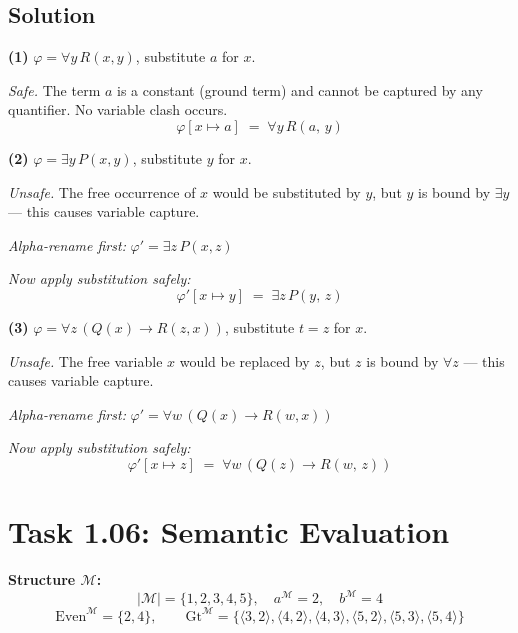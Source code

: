 \documentclass[11pt,a4paper]{article}
\newenvironment{solution}{%
    \begin{tcolorbox}[
        breakable,
        colback=green!4,
        colframe=green!50!black,
        fonttitle=\bfseries,
        title={ Solution},
        left=6pt, right=6pt, top=4pt, bottom=4pt
    ]%
    }{%
    \end{tcolorbox}%
}
\begin{document}
    \subsection*{Solution}
    \begin{solution}
        \textbf{(1)} $\varphi = \forall y\,R(x,y)$, substitute $a$ for $x$.

        \textit{Safe.} The term $a$ is a constant (ground term) and cannot be captured by any quantifier. No variable clash occurs.
        \[
            \varphi[x \mapsto a] \;=\; \forall y\,R(a,\,y)
        \]

        \bigskip
        \textbf{(2)} $\varphi = \exists y\,P(x,y)$, substitute $y$ for $x$.

        \textit{Unsafe.} The free occurrence of $x$ would be substituted by $y$, but $y$ is bound by $\exists y$ — this causes variable capture.

        \textit{Alpha-rename first:} $\varphi' = \exists z\,P(x,z)$

        \textit{Now apply substitution safely:}
        \[
            \varphi'[x \mapsto y] \;=\; \exists z\,P(y,\,z)
        \]

        \bigskip
        \textbf{(3)} $\varphi = \forall z\,(Q(x) \to R(z,x))$, substitute $t = z$ for $x$.

        \textit{Unsafe.} The free variable $x$ would be replaced by $z$, but $z$ is bound by $\forall z$ — this causes variable capture.

        \textit{Alpha-rename first:} $\varphi' = \forall w\,(Q(x) \to R(w,x))$

        \textit{Now apply substitution safely:}
        \[
            \varphi'[x \mapsto z] \;=\; \forall w\,(Q(z) \to R(w,\,z))
        \]
    \end{solution}

    \section*{Task 1.06: Semantic Evaluation}

    \textbf{Structure $\mathcal{M}$:}
    \[
        |\mathcal{M}| = \{1,2,3,4,5\},\quad
        a^{\mathcal{M}} = 2,\quad b^{\mathcal{M}} = 4
    \]
    \[
        \mathrm{Even}^{\mathcal{M}} = \{2,4\},\qquad
        \mathrm{Gt}^{\mathcal{M}} = \{\langle3,2\rangle,\langle4,2\rangle,\langle4,3\rangle,
        \langle5,2\rangle,\langle5,3\rangle,\langle5,4\rangle\}
    \]
\end{document}
